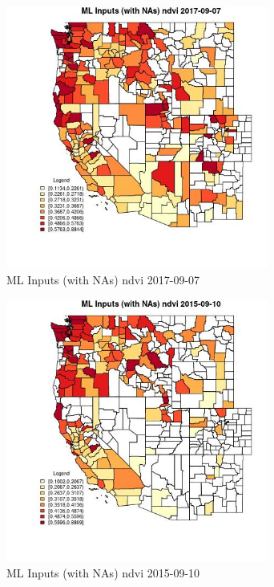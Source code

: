 \begin{figure} 
\centering  
\includegraphics[width=0.77\textwidth]{Code_Outputs/Report_ML_input_PM25_Step4_part_e_de_duplicated_aves_compiled_2019-05-21wNAs_CountyndviMean2017-09-07.jpg} 
\caption{\label{fig:Report_ML_input_PM25_Step4_part_e_de_duplicated_aves_compiled_2019-05-21wNAsCountyndviMean2017-09-07}ML Inputs (with NAs) ndvi 2017-09-07} 
\end{figure} 
 

\begin{figure} 
\centering  
\includegraphics[width=0.77\textwidth]{Code_Outputs/Report_ML_input_PM25_Step4_part_e_de_duplicated_aves_compiled_2019-05-21wNAs_CountyndviMean2015-09-10.jpg} 
\caption{\label{fig:Report_ML_input_PM25_Step4_part_e_de_duplicated_aves_compiled_2019-05-21wNAsCountyndviMean2015-09-10}ML Inputs (with NAs) ndvi 2015-09-10} 
\end{figure} 
 

